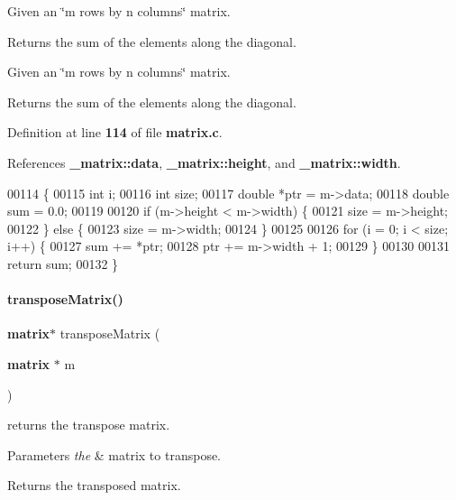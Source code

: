 Given an \char`\"{}m rows by n columns\char`\"{} matrix. 

\begin{DoxyReturn}{Returns}
the sum of the elements along the diagonal.
\end{DoxyReturn}
Given an \char`\"{}m rows by n columns\char`\"{} matrix.

\begin{DoxyReturn}{Returns}
the sum of the elements along the diagonal. 
\end{DoxyReturn}


Definition at line \textbf{ 114} of file \textbf{ matrix.\+c}.



References \textbf{ \+\_\+matrix\+::data}, \textbf{ \+\_\+matrix\+::height}, and \textbf{ \+\_\+matrix\+::width}.


\begin{DoxyCode}
00114                               \{
00115   \textcolor{keywordtype}{int} i;
00116   \textcolor{keywordtype}{int} size;
00117   \textcolor{keywordtype}{double} *ptr = m->data;
00118   \textcolor{keywordtype}{double} sum = 0.0;
00119 
00120   \textcolor{keywordflow}{if} (m->height < m->width) \{
00121     size = m->height;
00122   \} \textcolor{keywordflow}{else} \{
00123     size = m->width;
00124   \}
00125 
00126   \textcolor{keywordflow}{for} (i = 0; i < size; i++) \{
00127     sum += *ptr;
00128     ptr += m->width + 1;
00129   \}
00130 
00131   \textcolor{keywordflow}{return} sum;
00132 \}
\end{DoxyCode}
\mbox{\label{a00041_a2936260302742748b0639e8ec71d4d9f}} 
\paragraph{transpose\+Matrix()}
{\footnotesize\ttfamily \textbf{ matrix}$\ast$ transpose\+Matrix (\begin{DoxyParamCaption}\item[{\textbf{ matrix} $\ast$}]{m }\end{DoxyParamCaption})}



returns the transpose matrix. 


\begin{DoxyParams}{Parameters}
{\em the} & matrix to transpose. \\
\hline
\end{DoxyParams}
\begin{DoxyReturn}{Returns}
the transposed matrix. 
\end{DoxyReturn}


